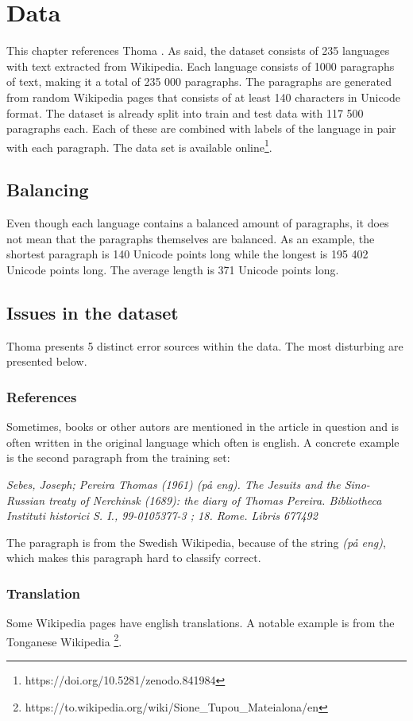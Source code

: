 \documentclass[conference]{IEEEtran}
\begin{document}
\section{Data}
This chapter references Thoma \cite{wili}. As said, the dataset consists of 235 languages with text extracted from Wikipedia. Each language consists of 1000 paragraphs of text, making it a total of 235 000 paragraphs. The paragraphs are generated from random Wikipedia pages that consists of at least 140 characters in Unicode format. The dataset is already split into train and test data with 117 500 paragraphs each. Each of these are combined with labels of the language in pair with each paragraph.  The data set is available online\footnote{https://doi.org/10.5281/zenodo.841984}.

\subsection{Balancing}
Even though each language contains a balanced amount of paragraphs, it does not mean that the paragraphs themselves are balanced. As an example, the shortest paragraph is 140 Unicode points long while the longest is 195 402 Unicode points long. The average length is 371 Unicode points long.

\subsection{Issues in the dataset}
Thoma presents 5 distinct error sources within the data. The most disturbing are presented below.

\subsubsection{References} \label{refrences}
Sometimes, books or other autors are mentioned in the article in question and is often written in the original language which often is english. A concrete example is the second paragraph from the training set:

\textit{Sebes, Joseph; Pereira Thomas (1961) (på eng). The Jesuits and the Sino-Russian treaty of Nerchinsk (1689): the diary of Thomas Pereira. Bibliotheca Instituti historici S. I., 99-0105377-3 ; 18. Rome. Libris 677492}

The paragraph is from the Swedish Wikipedia, because of the string \textit{(på eng)}, which makes this paragraph hard to classify correct.

\subsubsection{Translation}
Some Wikipedia pages have english translations. A notable example is from the Tonganese Wikipedia \footnote{https://to.wikipedia.org/wiki/Sione\_Tupou\_Mateialona/en}.
\end{document}
